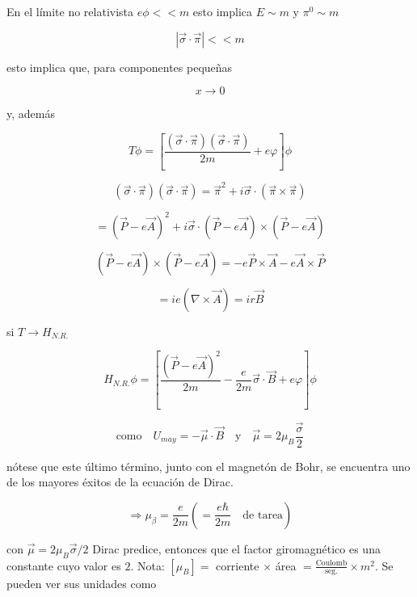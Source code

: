 \documentclass{report}
\begin{document}
En el límite no relativista $e \phi <<m$ esto implica $E \sim m$ y $\pi^{0} \sim m$ 

\[|\overrightarrow{\sigma} \cdot \overrightarrow{\pi}|<<m\]

esto implica que, para componentes pequeñas

\begin{equation}
x \rightarrow 0
\end{equation}

y, además

\[T \phi = [\frac{(\overrightarrow{\sigma} \cdot \overrightarrow{\pi})(\overrightarrow{\sigma} \cdot \overrightarrow{\pi})}{2m}+e \varphi] \phi \]

\[(\overrightarrow{\sigma} \cdot \overrightarrow{\pi})(\overrightarrow{\sigma} \cdot \overrightarrow{\pi}) = \overrightarrow{\pi}^{2} + i \overrightarrow{\sigma } \cdot (\overrightarrow{\pi} \times \overrightarrow{\pi})\]

\[= (\overrightarrow{P}-e \overrightarrow{A})^2  + i \overrightarrow{\sigma} \cdot (\overrightarrow{P}-e\overrightarrow{A}) \times (\overrightarrow{P}-e\overrightarrow{A})\]

\[(\overrightarrow{P}-e \overrightarrow{A}) \times (\overrightarrow{P}-e\overrightarrow{A}) = -e \overrightarrow{P} \times \overrightarrow{A} - e \overrightarrow{A} \times \overrightarrow{P}\]

\[= ie(\nabla \times \overrightarrow{A}) = ir \overrightarrow{B}\]

si $T \rightarrow H_{N.R.}$

\[H_{N.R.} \phi = [ \frac{(\overrightarrow{P}-e \overrightarrow{A})^2 }{2m} - \frac{e}{2m} \overrightarrow{\sigma} \cdot \overrightarrow{B} + e \varphi ] \phi \]


\[\text{como} \quad U_{may} = - \overrightarrow{\mu } \cdot \overrightarrow{B} \quad \text{y} \quad \overrightarrow{\mu } = 2 \mu _{B} \frac{\overrightarrow{\sigma}}{2}\]

nótese que este último término, junto con el magnetón de Bohr, se encuentra uno de los mayores éxitos de la ecuación de Dirac.

\begin{equation}
\Rightarrow \mu _{\beta} = \frac{e}{2m} (= \frac{e \hbar }{2m} \quad \text{de tarea})
\end{equation}

con $\overrightarrow{\mu } = 2 \mu _{B} \overrightarrow{\sigma }/2$ Dirac predice, entonces que el factor giromagnético es una constante cuyo valor es $2$. Nota: $[\mu_{B}]=$ corriente $\times$ área $= \frac{\text{Coulomb}}{\text{seg.}} \times m^2 $. Se pueden ver sus unidades como
\end{document}
